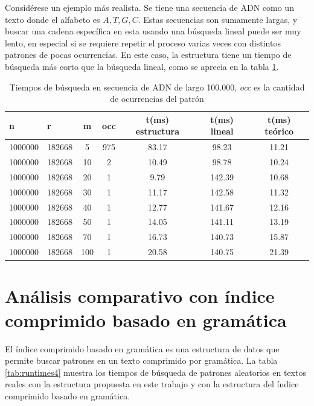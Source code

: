 Considérese un ejemplo más realista. Se tiene una secuencia de ADN como un texto donde el alfabeto es $A, T, G, C$. Estas secuencias son sumamente largas, y buscar una cadena específica en esta usando una búsqueda lineal puede ser muy lento, en especial si se requiere repetir el proceso varias veces con distintos patrones de pocas ocurrencias. En este caso, la estructura tiene un tiempo de búsqueda más corto que la búsqueda lineal, como se aprecia en la tabla \ref{tab:runtimes3}.

\begin{table}[h!]
\centering
\begin{tabular}{|l|l|c|c|c|c|c|}
\hline
\textbf{n} & \textbf{r} & \textbf{m} & \textbf{occ} & \textbf{t(ms) estructura} & t(ms) lineal & t(ms) teórico \\ \hline  
1000000 & 182668 & 5 & 975 & 83.17 & 98.23 & 11.21 \\
1000000 & 182668 & 10 & 2 & 10.49 & 98.78 & 10.24 \\
1000000 & 182668 & 20 & 1 & 9.79 & 142.39 & 10.68 \\
1000000 & 182668 & 30 & 1 & 11.17 & 142.58 & 11.32 \\
1000000 & 182668 & 40 & 1 & 12.77 & 141.67 & 12.16 \\
1000000 & 182668 & 50 & 1 & 14.05 & 141.11 & 13.19 \\
1000000 & 182668 & 70 & 1 & 16.73 & 140.73 & 15.87 \\
1000000 & 182668 & 100 & 1 & 20.58 & 140.75 & 21.39 \\ \hline
\end{tabular}
\caption{Tiempos de búsqueda en secuencia de ADN de largo 100.000, \textit{occ} es la cantidad de ocurrencias del patrón}
\label{tab:runtimes3}
\end{table}





\section{Análisis comparativo con índice comprimido basado en gramática}

El índice comprimido basado en gramática\cite{claude2020} es una estructura de datos que permite buscar patrones en un texto comprimido por gramática. La tabla \ref{tab:runtimes4} muestra los tiempos de búsqueda de patrones aleatorios en textos reales con la estructura propuesta en este trabajo y con la estructura del índice comprimido basado en gramática.


